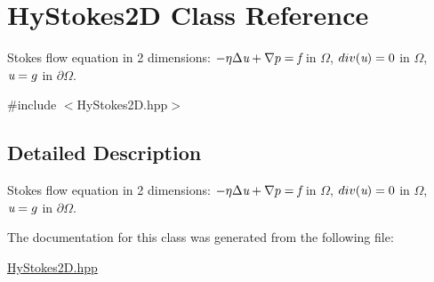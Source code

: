\hypertarget{classHyStokes2D}{
\section{HyStokes2D Class Reference}
\label{classHyStokes2D}
}


Stokes flow equation in 2 dimensions: $ -\eta \Delta \emph{u} + \nabla p = \emph{f}$ in $\Omega$, $ div(\emph{u}) = 0$ in $\Omega$, $\emph{u}=g$ in $\partial\Omega$.  




{\ttfamily \#include $<$HyStokes2D.hpp$>$}



\subsection{Detailed Description}
Stokes flow equation in 2 dimensions: $ -\eta \Delta \emph{u} + \nabla p = \emph{f}$ in $\Omega$, $ div(\emph{u}) = 0$ in $\Omega$, $\emph{u}=g$ in $\partial\Omega$. 

The documentation for this class was generated from the following file:\begin{DoxyCompactItemize}
\item 
\hyperlink{HyStokes2D_8hpp}{HyStokes2D.hpp}\end{DoxyCompactItemize}
